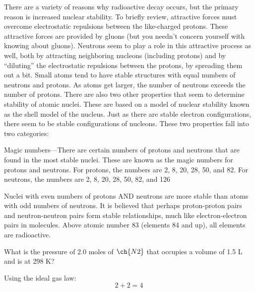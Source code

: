 There are a variety of reasons why radioactive decay occurs, but the primary reason is increased 
nuclear stability. To briefly review, attractive forces must overcome electrostatic repulsions 
between the like-charged protons. These attractive forces are provided by gluons (but you needn’t
concern yourself with knowing about gluons). Neutrons seem to play a role in this attractive 
process as well, both by attracting neighboring nucleons (including protons) and by “diluting” 
the electrostatic repulsions between the protons, by spreading them out a bit. Small atoms tend 
to have stable structures with equal numbers of neutrons and protons. As atoms get larger, the 
number of neutrons exceeds the number of protons. There are also two other properties that seem 
to determine stability of atomic nuclei. These are based on a model of nuclear stability known as 
the shell model of the nucleus. Just as there are stable electron configurations, there seem to be 
stable configurations of nucleons. These two properties fall into two categories:
\begin{enum}
    \item Magic numbers—There are certain numbers of protons and neutrons that are found in the 
        most stable nuclei. These are known as the magic numbers for protons and neutrons. For 
        protons, the numbers are 2, 8, 20, 28, 50, and 82. For neutrons, the numbers are 2, 8, 20,
        28, 50, 82, and 126
    \item Nuclei with even numbers of protons AND neutrons are more stable than atoms with odd 
        numbers of neutrons. It is believed that perhaps proton-proton pairs and neutron-neutron pairs 
        form stable relationships, much like electron-electron pairs in molecules. Above atomic number 
        83 (elements 84 and up), all elements are radioactive.
\end{enum}

\begin{problems}
    \item What is the pressure of 2.0 moles of $\ch{N2}$ that occupies a volume of 1.5 L and is at 298 K?
\end{problems}
\begin{solutions}
    \item Using the ideal gas law:
        \[
            2+2=4
        \]
\end{solutions}
